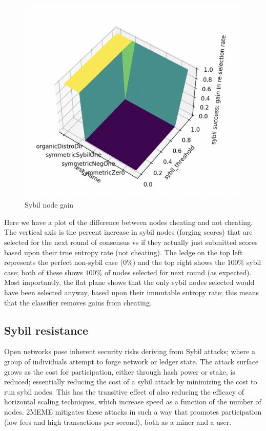 \documentclass{article}
\begin{document}
\begin{figure}
\centering
\includegraphics[width=\textwidth, height=\textwidth]{attack-success-suface-plot}
\caption{Sybil node gain}
\end{figure}

Here we have a plot of the difference between nodes cheating and not cheating. The vertical axis is the percent increase in sybil nodes (forging scores) that are selected for the next round of consensus vs if they actually just submitted scores based upon their true entropy rate (not cheating). The ledge on the top left represents the perfect non-sybil case ($0\%$) and the top right shows the $100\%$ sybil case; both of these shows $100\%$ of nodes selected for next round (as expected). Most importantly, the flat plane shows that the only sybil nodes selected would have been selected anyway, based upon their immutable entropy rate; this means that the classifier removes gains from cheating.

\subsection{Sybil resistance}
Open networks pose inherent security risks deriving from Sybil attacks; where a group of individuals attempt to forge network or ledger state. The attack surface grows as the cost for participation, either through hash power or stake, is reduced; essentially reducing the cost of a sybil attack by minimizing the cost to run sybil nodes. This has the transitive effect of also reducing the efficacy of horizontal scaling techniques, which increase speed as a function of the number of nodes. 2MEME mitigates these attacks in such a way that promotes participation (low fees and high transactions per second), both as a miner and a user. 
\end{document}

